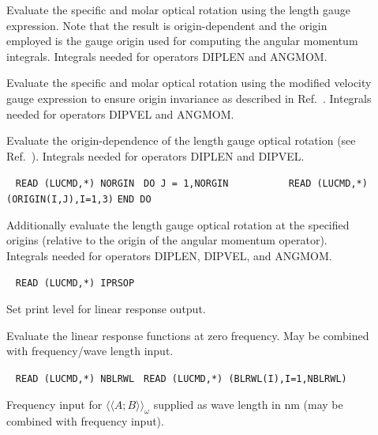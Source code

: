 \begin{description}
\item[] 
Evaluate the specific and molar optical rotation using the length gauge
expression. Note that the result is origin-dependent and the origin employed
is the gauge origin used for computing the angular momentum integrals.
Integrals needed for operators DIPLEN and ANGMOM.

\item[] 
Evaluate the specific and molar optical rotation using the modified velocity
gauge
expression to ensure origin invariance as described in
Ref.\ \cite{Pedersen:ORMVE}.
Integrals needed for operators DIPVEL and ANGMOM.

\item[] 
Evaluate the origin-dependence of the length gauge optical rotation
(see Ref.\ \cite{Pedersen:ORMVE}).
Integrals needed for operators DIPLEN and DIPVEL.

\item[] \verb| |\newline
  \verb|READ (LUCMD,*) NORGIN |\newline
  \verb|DO J = 1,NORGIN       |\newline
  \verb|   READ (LUCMD,*) (ORIGIN(I,J),I=1,3)|\newline
  \verb|END DO|

Additionally evaluate the length gauge optical rotation at the
specified origins (relative to the origin of the angular momentum
operator).
Integrals needed for operators DIPLEN, DIPVEL, and ANGMOM.
 
\item[] \verb| |\newline
   \verb|READ (LUCMD,*) IPRSOP|

Set print level for linear response output.

\item[]
Evaluate the linear response functions at zero frequency.
May be combined with frequency/wave length input.

\item[] \verb| |\newline
   \verb|READ (LUCMD,*) NBLRWL |\newline
   \verb|READ (LUCMD,*) (BLRWL(I),I=1,NBLRWL)|

Frequency input for $\langle\langle A;B \rangle\rangle_{\omega}$
supplied as wave length in nm (may be combined with frequency input).
 
\end{description}
